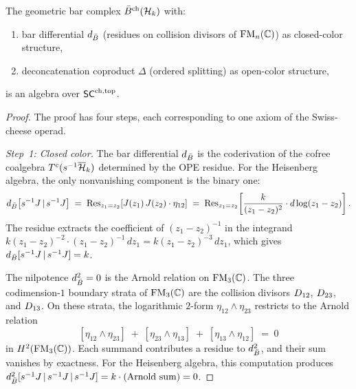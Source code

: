 \begin{theorem}
\label{thm:rosetta-swiss-cheese}
The geometric bar complex $\bar{B}^{\mathrm{ch}}(\mathcal{H}_k)$ with:
\begin{enumerate}[label=\textup{(\roman*)}]
\item bar differential $d_{\bar{B}}$
  \textup{(}residues on collision divisors of\/ $\mathrm{FM}_n(\mathbb{C})$\textup{)}
  as closed-color structure,
\item deconcatenation coproduct $\Delta$
  \textup{(}ordered splitting\textup{)} as open-color structure,
\end{enumerate}
is an algebra over $\mathsf{SC}^{\mathrm{ch,top}}$.
\end{theorem}

\begin{proof}
The proof has four steps, each corresponding to one axiom of the
Swiss-cheese operad.

\medskip
\noindent\textit{Step~1: Closed color.}\enspace
The bar differential $d_{\bar{B}}$ is the coderivation of the
cofree coalgebra $T^c(s^{-1}\overline{\mathcal{H}}_k)$ determined by
the OPE residue.  For the Heisenberg algebra, the only nonvanishing
component is the binary one:
\begin{equation}\label{eq:rosetta-dbar-binary}
d_{\bar{B}}\bigl[s^{-1}J \,|\, s^{-1}J\bigr]
\;=\;
\operatorname{Res}_{z_1 = z_2}\!\left[
  J(z_1)\, J(z_2) \cdot \eta_{12}
\right]
\;=\;
\operatorname{Res}_{z_1 = z_2}\!\left[
  \frac{k}{(z_1 - z_2)^2} \cdot d\log(z_1 - z_2)
\right].
\end{equation}
The residue extracts the coefficient of $(z_1 - z_2)^{-1}$
in the integrand $k(z_1 - z_2)^{-2} \cdot (z_1 - z_2)^{-1}\, dz_1
= k(z_1 - z_2)^{-3}\, dz_1$, which gives
$d_{\bar{B}}[s^{-1}J \,|\, s^{-1}J] = k$.

The nilpotence $d_{\bar{B}}^2 = 0$ is the Arnold relation
on $\mathrm{FM}_3(\mathbb{C})$.  The three codimension-$1$ boundary strata of
$\mathrm{FM}_3(\mathbb{C})$ are the collision divisors $D_{12}$,
$D_{23}$, and $D_{13}$.
On these strata, the logarithmic $2$-form
$\eta_{12} \wedge \eta_{23}$ restricts to the Arnold relation
\begin{equation}\label{eq:rosetta-arnold}
[\eta_{12} \wedge \eta_{23}]
\;+\;
[\eta_{23} \wedge \eta_{13}]
\;+\;
[\eta_{13} \wedge \eta_{12}]
\;=\; 0
\end{equation}
in $H^2(\mathrm{FM}_3(\mathbb{C}))$.
Each summand contributes a residue to $d_{\bar{B}}^2$, and their
sum vanishes by exactness.  For the Heisenberg algebra, this
computation produces $d_{\bar{B}}^2[s^{-1}J \,|\, s^{-1}J \,|\, s^{-1}J]
= k \cdot (\text{Arnold sum}) = 0$.


\end{proof}
